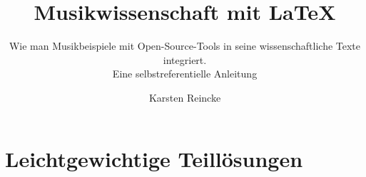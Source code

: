 \documentclass[
  DIV=calc,
  BCOR=5mm,
  12pt,
  headings=small,
  twoside,
  abstract=true,
  toc=bib,
  xcolor=dvipsnames,
  english,ngerman]{scrartcl}
\begin{document}
\nocite{*}

\titlehead{\textit{mycsrf} und Musik}
\subject{Release }
\title{Musikwissenschaft mit \LaTeX}
\subtitle{Wie man Musikbeispiele mit Open-Source-Tools 
in seine wissenschaftliche Texte integriert.\\
{\small Eine selbstreferentielle Anleitung}}
\author{Karsten Reincke}


\maketitle



\footnotesize
\tableofcontents

\normalsize







\section{Leichtgewichtige Teillösungen}
\end{document}
